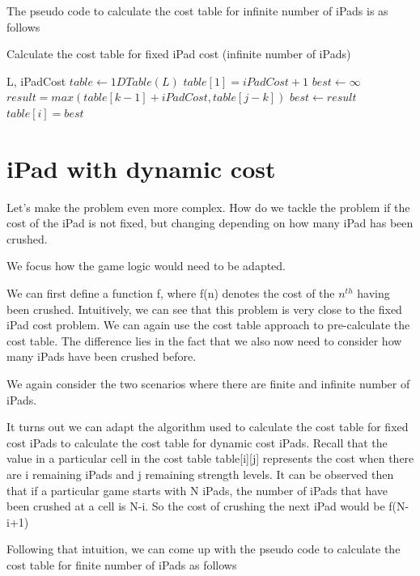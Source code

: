 \documentclass[12pt,a4paper,oneside]{report}
\begin{document}
The pseudo code to calculate the cost table for infinite number of iPads is as follows

\begin{algorithm}[H]
\caption{Calculate the cost table for fixed iPad cost (infinite number of iPads)}
\begin{algorithmic}[1]
\REQUIRE L, iPadCost
\STATE $table \leftarrow 1DTable(L)$
\STATE $table[1] = iPadCost+1$
	\STATE $best \leftarrow \infty$
		\STATE $result = max(table[k - 1] + iPadCost, table[j - k])$
			\STATE $best \leftarrow result$
		\ENDIF
	\ENDFOR
	\STATE $table[i] = best$
\ENDFOR
\end{algorithmic}
\end{algorithm}

\section{iPad with dynamic cost}

Let's make the problem even more complex. How do we tackle the problem if the cost of the iPad is not fixed, but changing depending on how many iPad has been crushed. 

We focus how the game logic would need to be adapted.

We can first define a function f, where f(n) denotes the cost of the $n^{th}$ having been crushed.
Intuitively, we can see that this problem is very close to the fixed iPad cost problem. We can again use the cost table approach to pre-calculate the cost table. The difference lies in the fact that we also now need to consider how many iPads have been crushed before.

We again consider the two scenarios where there are finite and infinite number of iPads.

It turns out we can adapt the algorithm used to calculate the cost table for fixed cost iPads to calculate the cost table for dynamic cost iPads. Recall that the value in a particular cell in the cost table table[i][j] represents the cost when there are i remaining iPads and j remaining strength levels. It can be observed then that if a particular game starts with N iPads, the number of iPads that have been crushed at a cell is N-i. So the cost of crushing the next iPad would be f(N-i+1)

Following that intuition, we can come up with the pseudo code to calculate the cost table for finite number of iPads as follows
\end{document}
